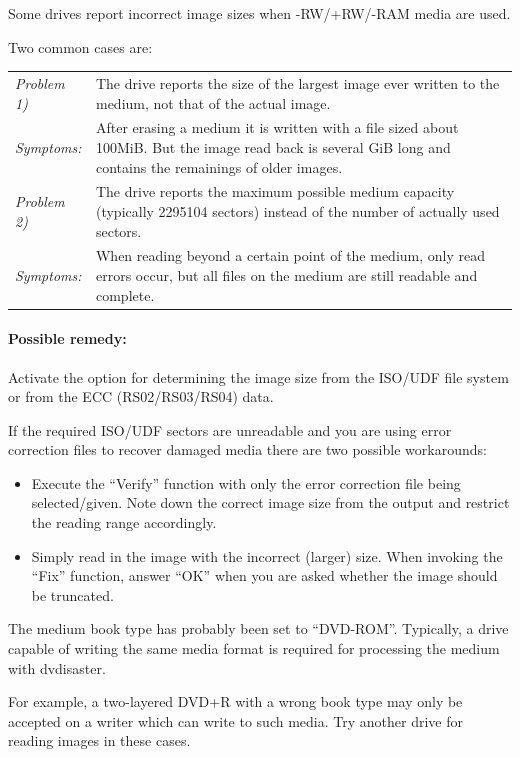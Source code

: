     {Some drives report incorrect image sizes when -RW/+RW/-RAM media are used.
    
      Two common cases are:

\smallskip

\begin{tabular}{lp{134mm}}
   {\em Problem 1)} & The drive reports the size of the largest image ever written to the medium, not that of the actual image. \\
   {\em Symptoms:} &  After erasing a medium it is written with a file sized about 100MiB. But the image read back is several GiB long and contains the remainings of older images. \\[3mm]

   {\em Problem 2)} & The drive reports the maximum possible medium capacity (typically 2295104 sectors) instead of the number of actually used sectors. \\
   {\em Symptoms:} & When reading beyond a certain point of the medium, only read errors occur, but all files on the medium are still readable and complete. \\
\end{tabular}

\paragraph{Possible remedy:} Activate the option for determining the image size from
the ISO/UDF file system or from the ECC (RS02/RS03/RS04) data.

\medskip

If the required ISO/UDF sectors are unreadable and you are using error correction
files to recover damaged media there are two possible workarounds:

\begin{itemize}
\item Execute the ``Verify'' function with only the error correction
  file being selected/given. Note down the correct image size from the
  output and restrict the reading range accordingly.
\item  Simply read in the image with the incorrect (larger) size.
  When invoking the ``Fix'' function, answer ``OK'' when you are asked
  whether the image should be truncated.
\end{itemize}}

    {The medium book type has probably been set to ``DVD-ROM''. Typically,
      a drive capable of writing the same media format is required for
      processing the medium with dvdisaster.

\smallskip
      
For example, a two-layered DVD+R with a wrong book type may only
be accepted on a writer which can write to such media. Try another
drive for reading images in these cases.}

